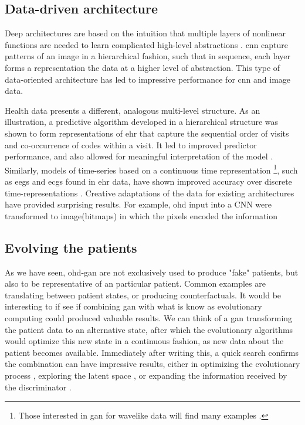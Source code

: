%
%
\subsection{Data-driven architecture}\label{sec:archi}

Deep architectures are based on the intuition that multiple layers of nonlinear functions are needed to learn complicated high-level abstractions \cite{Bengio_2009}. \gls{cnn} capture patterns of an image in a hierarchical fashion, such that in sequence, each layer forms a representation the data at a higher level of abstraction. This type of data-oriented architecture has led to impressive performance for \gls{cnn} and image data.\par

Health data presents a different, analogous multi-level structure. As an illustration, a predictive algorithm developed in a hierarchical structure was shown to form representations of \gls{ehr} that capture the sequential order of visits and co-occurrence of codes within a visit. It led to improved predictor performance, and also allowed for meaningful interpretation of the model \cite{choi2016multi}. Similarly, models of time-series based on a continuous time representation \footnote{Those interested in \gls{gan} for wavelike data will find many examples \cite{Delaney2019,Golany2019,Ye2019,Wang2019d,Singh2020,Aznan2019,Hartmann2018}.}, such as \glspl{eeg} and \glspl{ecg} found in \gls{ehr} data, have shown improved accuracy over discrete time-representations \cite{rubanova2019latent,de2019gru}. Creative adaptations of the data for existing architectures have provided surprising results. For example, \gls{ohd} input into a CNN were transformed to image(bitmaps) in which the pixels encoded the information \cite{Fukae2020}

%
%
\subsection{Evolving the patients}
As we have seen, \gls{ohd-gan} are not exclusively used to produce "fake" patients, but also to be representative of an particular patient. Common examples are translating between patient states, or producing counterfactuals. It would be interesting to if see if combining \gls{gan} with what is know as evolutionary computing could produced valuable results. We can think of a \gls{gan} transforming the patient data to an alternative state, after which the evolutionary algorithms would optimize this new state in a continuous fashion, as new data about the patient becomes available. Immediately after writing this, a quick search confirms the combination can have impressive results, either in optimizing the evolutionary process \cite{He2020-zm}, exploring the latent space \cite{Schrum2020-vl}, or expanding the information received by the discriminator \cite{Mu2020-id}. 


